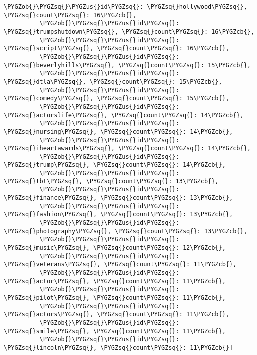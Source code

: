 \documentclass[letterpaper,10pt,english]{sphinxmanual}
\begin{document}
\begin{Verbatim}[commandchars=\\\{\}]
          \PYGZob{}\PYGZsq{}\PYGZus{}id\PYGZsq{}: \PYGZsq{}hollywood\PYGZsq{}, \PYGZsq{}count\PYGZsq{}: 16\PYGZcb{},
          \PYGZob{}\PYGZsq{}\PYGZus{}id\PYGZsq{}: \PYGZsq{}trumpshutdown\PYGZsq{}, \PYGZsq{}count\PYGZsq{}: 16\PYGZcb{},
          \PYGZob{}\PYGZsq{}\PYGZus{}id\PYGZsq{}: \PYGZsq{}script\PYGZsq{}, \PYGZsq{}count\PYGZsq{}: 16\PYGZcb{},
          \PYGZob{}\PYGZsq{}\PYGZus{}id\PYGZsq{}: \PYGZsq{}beverlyhills\PYGZsq{}, \PYGZsq{}count\PYGZsq{}: 15\PYGZcb{},
          \PYGZob{}\PYGZsq{}\PYGZus{}id\PYGZsq{}: \PYGZsq{}dtla\PYGZsq{}, \PYGZsq{}count\PYGZsq{}: 15\PYGZcb{},
          \PYGZob{}\PYGZsq{}\PYGZus{}id\PYGZsq{}: \PYGZsq{}comedy\PYGZsq{}, \PYGZsq{}count\PYGZsq{}: 15\PYGZcb{},
          \PYGZob{}\PYGZsq{}\PYGZus{}id\PYGZsq{}: \PYGZsq{}actorslife\PYGZsq{}, \PYGZsq{}count\PYGZsq{}: 14\PYGZcb{},
          \PYGZob{}\PYGZsq{}\PYGZus{}id\PYGZsq{}: \PYGZsq{}nursing\PYGZsq{}, \PYGZsq{}count\PYGZsq{}: 14\PYGZcb{},
          \PYGZob{}\PYGZsq{}\PYGZus{}id\PYGZsq{}: \PYGZsq{}iheartawards\PYGZsq{}, \PYGZsq{}count\PYGZsq{}: 14\PYGZcb{},
          \PYGZob{}\PYGZsq{}\PYGZus{}id\PYGZsq{}: \PYGZsq{}trump\PYGZsq{}, \PYGZsq{}count\PYGZsq{}: 14\PYGZcb{},
          \PYGZob{}\PYGZsq{}\PYGZus{}id\PYGZsq{}: \PYGZsq{}tbt\PYGZsq{}, \PYGZsq{}count\PYGZsq{}: 13\PYGZcb{},
          \PYGZob{}\PYGZsq{}\PYGZus{}id\PYGZsq{}: \PYGZsq{}finance\PYGZsq{}, \PYGZsq{}count\PYGZsq{}: 13\PYGZcb{},
          \PYGZob{}\PYGZsq{}\PYGZus{}id\PYGZsq{}: \PYGZsq{}fashion\PYGZsq{}, \PYGZsq{}count\PYGZsq{}: 13\PYGZcb{},
          \PYGZob{}\PYGZsq{}\PYGZus{}id\PYGZsq{}: \PYGZsq{}photography\PYGZsq{}, \PYGZsq{}count\PYGZsq{}: 13\PYGZcb{},
          \PYGZob{}\PYGZsq{}\PYGZus{}id\PYGZsq{}: \PYGZsq{}music\PYGZsq{}, \PYGZsq{}count\PYGZsq{}: 12\PYGZcb{},
          \PYGZob{}\PYGZsq{}\PYGZus{}id\PYGZsq{}: \PYGZsq{}veterans\PYGZsq{}, \PYGZsq{}count\PYGZsq{}: 11\PYGZcb{},
          \PYGZob{}\PYGZsq{}\PYGZus{}id\PYGZsq{}: \PYGZsq{}actor\PYGZsq{}, \PYGZsq{}count\PYGZsq{}: 11\PYGZcb{},
          \PYGZob{}\PYGZsq{}\PYGZus{}id\PYGZsq{}: \PYGZsq{}pilot\PYGZsq{}, \PYGZsq{}count\PYGZsq{}: 11\PYGZcb{},
          \PYGZob{}\PYGZsq{}\PYGZus{}id\PYGZsq{}: \PYGZsq{}actors\PYGZsq{}, \PYGZsq{}count\PYGZsq{}: 11\PYGZcb{},
          \PYGZob{}\PYGZsq{}\PYGZus{}id\PYGZsq{}: \PYGZsq{}smile\PYGZsq{}, \PYGZsq{}count\PYGZsq{}: 11\PYGZcb{},
          \PYGZob{}\PYGZsq{}\PYGZus{}id\PYGZsq{}: \PYGZsq{}lincoln\PYGZsq{}, \PYGZsq{}count\PYGZsq{}: 11\PYGZcb{}]
\end{Verbatim}
\end{document}
